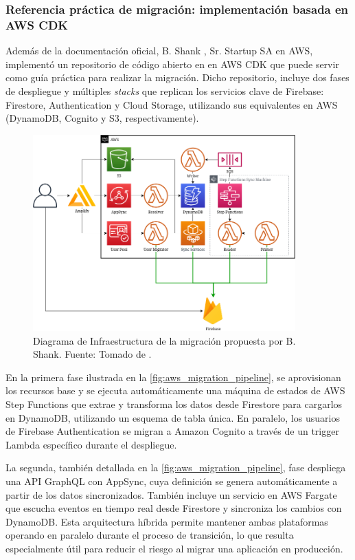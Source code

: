 \subsubsection{Referencia práctica de migración: implementación basada en AWS CDK}

Además de la documentación oficial, B. Shank \cite{Shank2021}, Sr. Startup SA en AWS, implementó un repositorio de código abierto en en AWS CDK que puede servir como guía práctica para realizar la migración. Dicho repositorio, incluye dos fases de despliegue y múltiples \textit{stacks} que replican los servicios clave de Firebase: Firestore, Authentication y Cloud Storage, utilizando sus equivalentes en AWS (DynamoDB, Cognito y S3, respectivamente).

\begin{figure}[H]
\centering
\includegraphics[width=0.9\textwidth]{img/figures/fig5-etl-pipeline-aws.png}
\caption{Diagrama de Infraestructura de la migración propuesta por B. Shank. Fuente: Tomado de \cite{Shank2021}.}
\label{fig:aws_migration_pipeline}
\end{figure}

En la primera fase ilustrada en la \autoref{fig:aws_migration_pipeline}, se aprovisionan los recursos base y se ejecuta automáticamente una máquina de estados de AWS Step Functions que extrae y transforma los datos desde Firestore para cargarlos en DynamoDB, utilizando un esquema de tabla única. En paralelo, los usuarios de Firebase Authentication se migran a Amazon Cognito a través de un trigger Lambda específico durante el despliegue.

La segunda, también detallada en la \autoref{fig:aws_migration_pipeline}, fase despliega una API GraphQL con AppSync, cuya definición se genera automáticamente a partir de los datos sincronizados. También incluye un servicio en AWS Fargate que escucha eventos en tiempo real desde Firestore y sincroniza los cambios con DynamoDB. Esta arquitectura híbrida permite mantener ambas plataformas operando en paralelo durante el proceso de transición, lo que resulta especialmente útil para reducir el riesgo al migrar una aplicación en producción.

